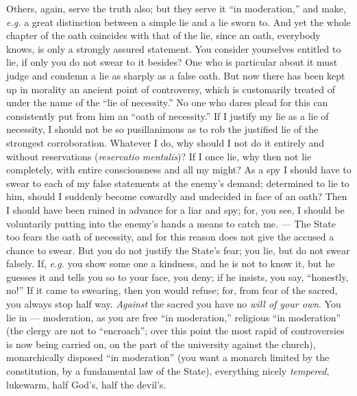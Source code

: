 Others, again, serve the truth also; but they serve it ``in moderation,'' 
and make, \textit{e.g.} a great distinction between a simple lie and a lie 
sworn to. And yet the whole chapter of the oath coincides with that of the 
lie, since an oath, everybody knows, is only a strongly assured statement. You 
consider yourselves entitled to lie, if only you do not swear to it besides? 
One who is particular about it must judge and condemn a lie as sharply as a 
false oath. But now there has been kept up in morality an ancient point of 
controversy, which is customarily treated of under the name of the ``lie of 
necessity.'' No one who dares plead for this can consistently put from him an 
``oath of necessity.'' If I justify my lie as a lie of necessity, I should 
not be so pusillanimous as to rob the justified lie of the strongest 
corroboration. Whatever I do, why should I not do it entirely and without 
reservations (\textit{reservatio mentalis})? If I once lie, why then not lie 
completely, with entire consciousness and all my might? As a spy I should have 
to swear to each of my false statements at the enemy's demand; determined to 
lie to him, should I suddenly become cowardly and undecided in face of an 
oath? Then I should have been ruined in advance for a liar and spy; for, you 
see, I should be voluntarily putting into the enemy's hands a means to catch 
me. --- The State too fears the oath of necessity, and for this reason does not 
give the accused a chance to swear. But you do not justify the State's fear; 
you lie, but do not swear falsely. If, \textit{e.g.} you show some one a 
kindness, and he is not to know it, but he guesses it and tells you so to your 
face, you deny; if he insists, you say, ``honestly, no!'' If it came to 
swearing, then you would refuse; for, from fear of the sacred, you always stop 
half way. \textit{Against} the sacred you have no \textit{will of your own}. 
You lie in --- moderation, as you are free ``in moderation,'' religious ``in 
moderation'' (the clergy are not to ``encroach''; over this point the most 
rapid of controversies is now being carried on, on the part of the university 
against the church), monarchically disposed ``in moderation'' (you want a 
monarch limited by the constitution, by a fundamental law of the State), 
everything nicely \textit{tempered}, lukewarm, half God's, half the devil's.

